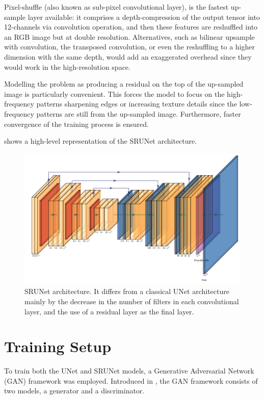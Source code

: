Pixel-shuffle (also known as sub-pixel convolutional layer), is the fastest up-sample layer available: it comprises a depth-compression of the output tensor into 12-channels via convolution operation, and then these features are reshuffled into an RGB image but at double resolution. Alternatives, such as bilinear upsample with convolution, the transposed convolution, or even the reshuffling to a higher dimension with the same depth, would add an exaggerated overhead since they would work in the high-resolution space.

Modelling the problem as producing a residual on the top of the up-sampled image is particularly convenient. This forces the model to focus on the high-frequency patterns sharpening edges or increasing texture details since the low-frequency patterns are still from the up-sampled image. Furthermore, faster convergence of the training process is ensured.
 
 shows a high-level representation of the SRUNet architecture.

\begin{figure}[ht]
\centering
\includegraphics[width=1.0\textwidth]{static/srunet_architecture.png}
\caption{SRUNet architecture. It differs from a classical UNet architecture mainly by the decrease in the number of filters in each convolutional layer, and the use of a residual layer as the final layer.}
\label{fig:srunet}
\end{figure}

\section{Training Setup}
\label{sec:training-setup}

To train both the UNet and SRUNet models, a Generative Adversarial Network (GAN) framework was employed. Introduced in \cite{goodfellow2020generative}, the GAN framework consists of two models, a generator and a discriminator.


